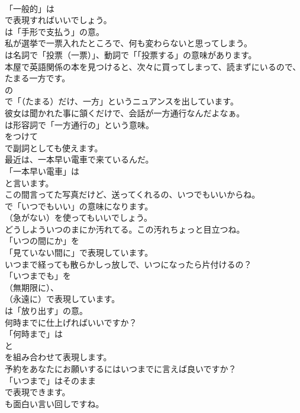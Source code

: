 \documentclass[8pt]{extreport}
\begin{document}
\begin{CJK}{UTF8}{min}
\\	「一般的」は 
\\	で表現すればいいでしょう。
\\	は「手形で支払う」の意。	
\\	私が選挙で一票入れたところで、何も変わらないと思ってしまう。 
\\	は名詞で「投票（一票）」、動詞で「「投票する」の意味があります。	
\\	本屋で英語関係の本を見つけると、次々に買ってしまって、読まずにいるので、たまる一方です。 
\\	の
\\	で「（たまる）だけ、一方」というニュアンスを出しています。	
\\	彼女は聞かれた事に頷くだけで、会話が一方通行なんだよなぁ。 
\\	は形容詞で「一方通行の」という意味。
\\	をつけて
\\	で副詞としても使えます。	
\\	最近は、一本早い電車で来ているんだ。 
\\	「一本早い電車」は
\\	と言います。	
\\	この間言ってた写真だけど、送ってくれるの、いつでもいいからね。 
\\	で「いつでもいい」の意味になります。
\\	（急がない）を使ってもいいでしょう。	
\\	どうしよういつのまにか汚れてる。この汚れちょっと目立つね。 
\\	「いつの間にか」を
\\	「見ていない間に」で表現しています。	
\\	いつまで経っても散らかしっ放しで、いつになったら片付けるの？ 
\\	「いつまでも」を
\\	（無期限に）、
\\	（永遠に）で表現しています。
\\	は「放り出す」の意。	
\\	何時までに仕上げればいいですか？ 
\\	「何時まで」は 
\\	と 
\\	を組み合わせて表現します。	
\\	予約をあなたにお願いするにはいつまでに言えば良いですか？ 
\\	「いつまで」はそのまま
\\	で表現できます。
\\	も面白い言い回しですね。	

\end{CJK}
\end{document}
